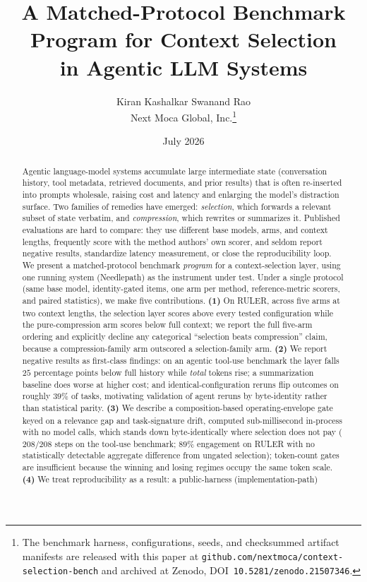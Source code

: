 \documentclass[11pt]{article}
\title{A Matched-Protocol Benchmark Program for Context Selection\\ in Agentic LLM Systems}
\author{Kiran Kashalkar \quad Swanand Rao \\ Next Moca Global, Inc.\thanks{The benchmark harness, configurations,
seeds, and checksummed artifact manifests are released with this paper at
\texttt{github.com/nextmoca/context-selection-bench} and archived at Zenodo,
DOI~\texttt{10.5281/zenodo.21507346}.}}
\date{July 2026}
\newcommand{\NP}{Needlepath}
\begin{document}
\maketitle

\begin{abstract}
Agentic language-model systems accumulate large intermediate state (conversation history,
tool metadata, retrieved documents, and prior results) that is often re-inserted into
prompts wholesale, raising cost and latency and enlarging the model's distraction surface.
Two families of remedies have emerged: \emph{selection}, which forwards a relevant subset of
state verbatim, and \emph{compression}, which rewrites or summarizes it. Published evaluations
are hard to compare: they use different base models, arms, and context lengths, frequently
score with the method authors' own scorer, and seldom report negative results, standardize
latency measurement, or close the reproducibility loop. We present a matched-protocol
benchmark \emph{program} for a context-selection layer, using one running system (\NP{}) as the
instrument under test. Under a single protocol (same base model, identity-gated items, one
arm per method, reference-metric scorers, and paired statistics), we make five
contributions. \textbf{(1)} On RULER, across five arms at two context lengths, the selection
layer scores above every tested configuration while the pure-compression arm scores below full
context; we report the full five-arm ordering and explicitly decline any categorical
``selection beats compression'' claim, because a compression-family arm outscored a
selection-family arm. \textbf{(2)} We report negative results as first-class findings: on an
agentic tool-use benchmark the layer falls $25$ percentage points below full history while
\emph{total} tokens rise; a summarization baseline does worse at higher cost; and
identical-configuration reruns flip outcomes on roughly $39\%$ of tasks, motivating validation
of agent reruns by byte-identity rather than statistical parity. \textbf{(3)} We describe a
composition-based operating-envelope gate keyed on a relevance gap and task-signature drift,
computed sub-millisecond in-process with no model calls, which stands down byte-identically where
selection does not pay ($208/208$ steps on the tool-use benchmark; $89\%$ engagement on RULER
with no statistically detectable aggregate difference from ungated selection); token-count gates
are insufficient because the winning and losing regimes occupy the same token scale.
\textbf{(4)} We treat reproducibility as a result: a public-harness (implementation-path)

\end{abstract}
\end{document}
